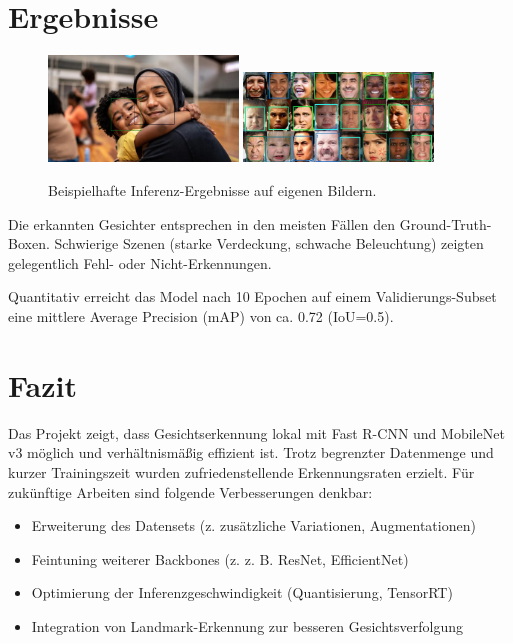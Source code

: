 \documentclass[11pt,a4paper]{article}
\begin{document}
\section{Ergebnisse}
\begin{figure}[h!]
\centering
\includegraphics[width=0.45\textwidth]{../inference_results/people.jpg}
\includegraphics[width=0.45\textwidth]{../inference_results/common-emotions.jpg}
\caption{Beispielhafte Inferenz-Ergebnisse auf eigenen Bildern.}
\end{figure}
Die erkannten Gesichter entsprechen in den meisten Fällen den Ground-Truth-Boxen. Schwierige Szenen (starke Verdeckung, schwache Beleuchtung) zeigten gelegentlich Fehl- oder Nicht-Erkennungen.

Quantitativ erreicht das Model nach 10 Epochen auf einem Validierungs-Subset eine mittlere Average Precision (mAP) von ca. 0.72 (IoU=0.5).

\section{Fazit}
Das Projekt zeigt, dass Gesichtserkennung lokal mit Fast R-CNN und MobileNet v3 möglich und verhältnismäßig effizient ist. Trotz begrenzter Datenmenge und kurzer Trainingszeit wurden zufriedenstellende Erkennungsraten erzielt. Für zukünftige Arbeiten sind folgende Verbesserungen denkbar:
\begin{itemize}
\item Erweiterung des Datensets (z. zusätzliche Variationen, Augmentationen)
\item Feintuning weiterer Backbones (z. z. B. ResNet, EfficientNet)
\item Optimierung der Inferenzgeschwindigkeit (Quantisierung, TensorRT)
\item Integration von Landmark-Erkennung zur besseren Gesichtsverfolgung
\end{itemize}
\end{document}
